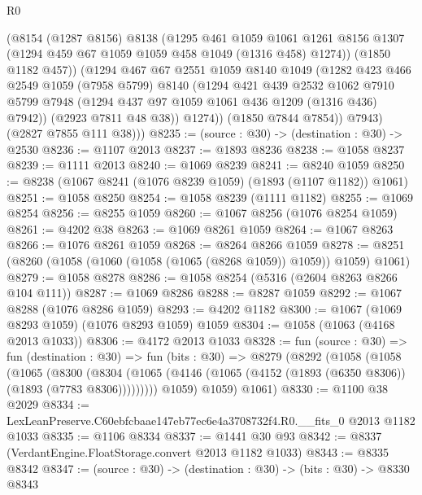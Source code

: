 \begin{lexlean}{R0}
\begin{coremodule}
              (@8154
                (@1287 @8156)
                @8138
                (@1295
                  @461
                  @1059
                  @1061
                  @1261
                  @8156
                  @1307
                  (@1294 @459 @67 @1059 @1059 @458 @1049 (@1316 @458) @1274))
                (@1850 @1182 @457))
              (@1294
                @467
                @67
                @2551
                @1059
                @8140
                @1049
                (@1282
                  @423
                  @466
                  @2549
                  @1059
                  (@7958 @5799)
                  @8140
                  (@1294
                    @421
                    @439
                    @2532
                    @1062
                    @7910
                    @5799
                    @7948
                    (@1294 @437 @97 @1059 @1061 @436 @1209 (@1316 @436) @7942))
                  (@2923 @7811 @48 @38))
                @1274))
            (@1850 @7844 @7854))
          @7943)
        (@2827 @7855 @111 @38)))
@8235 := (source : @30) -> (destination : @30) -> @2530
@8236 := @1107 @2013
@8237 := @1893 @8236
@8238 := @1058 @8237
@8239 := @1111 @2013
@8240 := @1069 @8239
@8241 := @8240 @1059
@8250 := @8238 (@1067 @8241 (@1076 @8239 @1059) (@1893 (@1107 @1182)) @1061)
@8251 := @1058 @8250
@8254 := @1058 @8239 (@1111 @1182)
@8255 := @1069 @8254
@8256 := @8255 @1059
@8260 := @1067 @8256 (@1076 @8254 @1059)
@8261 := @4202 @38
@8263 := @1069 @8261 @1059
@8264 := @1067 @8263
@8266 := @1076 @8261 @1059
@8268 := @8264 @8266 @1059
@8278 := @8251 (@8260 (@1058 (@1060 (@1058 (@1065 (@8268 @1059)) @1059)) @1059) @1061)
@8279 := @1058 @8278
@8286 := @1058 @8254 (@5316 (@2604 @8263 @8266 @104 @111))
@8287 := @1069 @8286
@8288 := @8287 @1059
@8292 := @1067 @8288 (@1076 @8286 @1059)
@8293 := @4202 @1182
@8300 := @1067 (@1069 @8293 @1059) (@1076 @8293 @1059) @1059
@8304 := @1058 (@1063 (@4168 @2013 @1033))
@8306 := @4172 @2013 @1033
@8328 := fun (source : @30) =>
  fun (destination : @30) =>
  fun (bits : @30) =>
  @8279
    (@8292
      (@1058
        (@1058
          (@1065
            (@8300
              (@8304 (@1065 (@4146 (@1065 (@4152 (@1893 (@6350 @8306)) (@1893 (@7783 @8306)))))))))
          @1059)
        @1059)
      @1061)
@8330 := @1100 @38 @2029
@8334 := LexLeanPreserve.C60ebfcbaae147eb77ec6e4a3708732f4.R0.__fits_0 @2013 @1182 @1033
@8335 := @1106 @8334
@8337 := @1441 @30 @93
@8342 := @8337 (VerdantEngine.FloatStorage.convert @2013 @1182 @1033)
@8343 := @8335 @8342
@8347 := (source : @30) -> (destination : @30) -> (bits : @30) -> @8330 @8343

\end{coremodule}
\end{lexlean}
